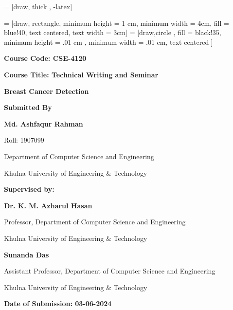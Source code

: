 \documentclass[12]{article}
\begin{document}
 = [draw, thick , -latex]

 = [draw, rectangle, minimum height = 1 cm, minimum width = 4cm, fill = blue!40, text centered, text width = 3cm]
 = [draw,circle , fill = black!35, minimum height = .01 cm , minimum width = .01 cm, text centered ]

\begin{titlepage}
    \large
    \centering
    \textbf{Course Code: CSE-4120} \par
    \large
    \large
    \textbf{Course Title: Technical Writing and Seminar} \par
    \large
    \centering
    \vspace*{0.5in}
    {\Huge \textbf{Breast Cancer Detection} \par}
    \vspace{0.4in}
    {\large
    \textbf{Submitted By}}
    \vspace{0.4in}
    {\large 
    
        \textbf{Md. Ashfaqur Rahman} \par
        Roll: 1907099 \par
        Department of Computer Science and Engineering \par
        Khulna University of Engineering \& Technology \par
    }
    
      \large
    \textbf{Supervised by:} \par
    \vspace{0.1in}
   \textbf{ Dr. K. M. Azharul Hasan} \par
    Professor, Department of Computer Science and Engineering \par
    Khulna University of Engineering \& Technology \par
    \vspace{0.1in}
   \textbf{ Sunanda Das} \par
    Assistant Professor, Department of Computer Science and Engineering \par
     Khulna University of Engineering \& Technology \par
     \vspace{0.4in}
     \textbf{Date of Submission: 03-06-2024}

    
\end{titlepage}

\tableofcontents
\pagebreak
\end{document}
